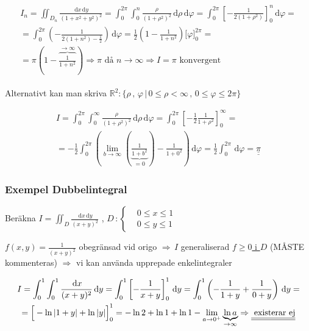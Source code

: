 \documentclass[a4paper]{article}
\newcommand{\svar}[1]{\underline{\underline{#1}}}
\newcommand{\de}[1]{\,\mathrm{d}#1}
\DeclarePairedDelimiter \abs{\lvert}{\rvert}
\begin{document}
\begin{gather}\label{eq:12.2}
\begin{split}
	I_n = \iint_{D_n} \frac{\de{x}\de{y}}{(1+x^2+y^2)^2} =
	\int_0^{2\pi}\int_0^n \frac{\rho}{(1+\rho^2)^2} \de{\rho}\de{\varphi} =
	\int_0^{2\pi} \left[-\frac{1}{2(1+\rho^2)}\right]_0^n \de{\varphi} = \\
	= \int_0^{2\pi} \left(- \frac{1}{2(1+n^2) - \frac{1}{2}}\right) \de{\varphi} =
	\frac{1}{2}\left(1-\frac{1}{1+n^2}\right)\Big[\varphi\Big]_0^{2\pi} = \\
	= \pi\left(1 - \overbrace{\frac{1}{1+n^2}}^{\rightarrow \infty}\right)
	\Rightarrow \pi \text{ då $n \rightarrow \infty \Rightarrow I = \pi$ konvergent}
\end{split}
\end{gather}

Alternativt kan man skriva $\mathbb{R}^2: \{\rho\,,\,\varphi \,|\, 0\leq \rho < \infty \,,\, 0 \leq \varphi \leq 2\pi \}$

\begin{gather*}
	I = \int_0^{2\pi} \int_0^\infty \frac{\rho}{(1+\rho^2)^2} \de{\rho}\de{\varphi} =
	\int_0^{2\pi} \left[-\frac{1}{2}\frac{1}{1+\rho^2}\right]_0^\infty = \\
	=-\frac{1}{2}\int_0^{2\pi} \left(\lim_{b\rightarrow\infty}\left(\underbrace{\frac{1}{1+b^2}}_{=0}\right) - \frac{1}{1+0^2}\right)\de{\varphi} =
	\frac{1}{2}\int_0^{2\pi}\de{\varphi} =
	\svar{\pi}
\end{gather*}

\newpage
\subsubsection{Exempel Dubbelintegral}

Beräkna $I=\iint_D \frac{\de{x}\de{y}}{(x+y)^2}$ , $D \,:
\begin{cases}
	& 0 \leq x \leq 1 \\
	& 0 \leq y \leq 1
\end{cases}$ \newline

$f(x,y) = \frac{1}{(x+y)^2}$ obegränsad vid origo $\Rightarrow \,I$ generaliserad \newline
\underline{$f \geq 0$ i $D$} (MÅSTE kommenteras) $\Rightarrow$ vi kan använda upprepade enkelintegraler

\begin{gather*}
	I = \int_0^1\int_0^1 \frac{\de{x}}{(x+y)^2}\de{y} =
	\int_0^1 \left[-\frac{1}{x+y}\right]_0^1 \de{y} =
	\int_0^1 \left(-\frac{1}{1+y} + \frac{1}{0+y}\right) \de{y} = \\
	= \Big[ -\ln{\abs{1+y}} + \ln{\abs{y}}\Big]_0^1 =
	- \ln{2} + \ln{1} + \ln{1} - \lim_{a\rightarrow0^+}\underbrace{\ln{a}}_{\rightarrow\infty} \Rightarrow \svar{\text{ existerar ej}}
\end{gather*}
\end{document}
